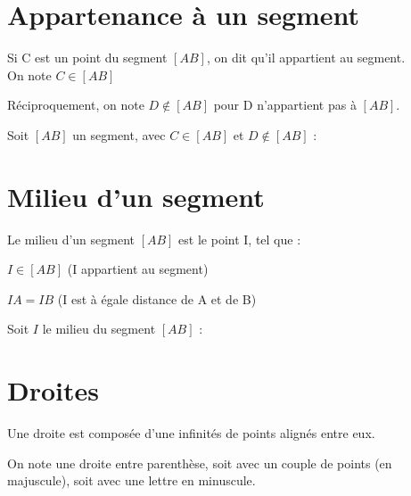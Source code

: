 \documentclass[11pt]{article}
\begin{document}
\section{Appartenance à un segment}

\begin{definition}
Si C est un point du segment $[AB]$, on dit qu'il appartient au segment. \\
On note $C\in [AB]$
\end{definition}

\begin{remarque}
Réciproquement, on note $D \notin [AB]$ pour D n'appartient pas à $[AB]$.
\end{remarque}

\newpage
\begin{exemple}
 Soit $[AB]$ un segment, avec $C \in [AB]$ et $D \notin [AB]$ : \\
      
  \end{exemple}

\section{Milieu d'un segment}

  \begin{definition}
    Le milieu d'un segment $[AB]$ est le point I, tel que :
    \begin{enu}
    \item $I \in [AB]$ (I appartient au segment)
    \item $IA=IB$ (I est à égale distance de A et de B)
    \end{enu}
  \end{definition}
  
  \begin{exemple}
    Soit $I$ le milieu du segment $[AB]$ : \\
      
  \end{exemple}

\section{Droites}

\begin{definition}
  Une droite est composée d'une infinités de points alignés entre eux.
\end{definition}

\begin{notation}
  On note une droite entre parenthèse, soit avec un couple de points
  (en majuscule), soit avec une lettre en minuscule.
\end{notation}
\end{document}
